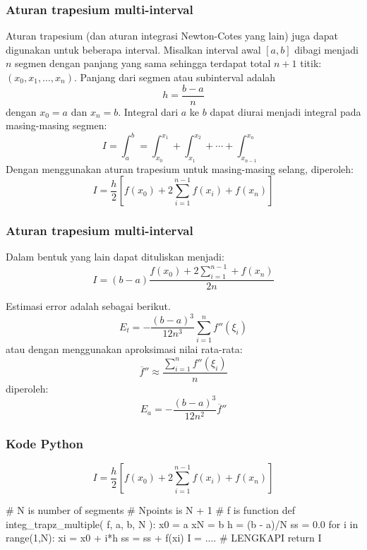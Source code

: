 \begin{frame} 
\frametitle{Aturan trapesium multi-interval}
\fontsize{9pt}{8.0}\selectfont

Aturan trapesium (dan aturan integrasi Newton-Cotes yang lain)
juga dapat digunakan untuk beberapa interval. Misalkan interval
awal $[a,b]$ dibagi menjadi $n$ segmen dengan panjang yang sama sehingga terdapat
total $n+1$ titik: $(x_0, x_1, \ldots, x_n)$. Panjang dari segmen atau subinterval
adalah
\begin{equation*}
h = \frac{b - a}{n}
\end{equation*}
dengan $x_0 = a$ dan $x_n = b$. Integral dari $a$ ke $b$ dapat diurai menjadi
integral pada masing-masing segmen:
\begin{equation*}
I = \int_{a}^{b} = \int_{x_0}^{x_1} + \int_{x_1}^{x_2} + \cdots + \int_{x_{n-1}}^{x_n}
\end{equation*}
Dengan menggunakan aturan trapesium untuk masing-masing selang, diperoleh:
\begin{equation*}
I = \frac{h}{2}\left[
    f(x_{0}) + 2\sum_{i=1}^{n-1} f(x_{i}) + f(x_{n})
\right]
\end{equation*}

\end{frame}


\begin{frame}
\frametitle{Aturan trapesium multi-interval}
\fontsize{9pt}{8.0}\selectfont

Dalam bentuk yang lain dapat dituliskan menjadi:
\begin{equation*}
I = (b - a) \frac{f(x_{0}) + 2\sum_{i=1}^{n-1} + f(x_{n})}{2n}
\end{equation*}

Estimasi error adalah sebagai berikut.
\begin{equation*}
E_{t} = -\frac{(b - a)^3}{12n^3} \sum_{i=1}^{n} f''(\xi_{i})
\end{equation*}
atau dengan menggunakan aproksimasi nilai rata-rata:
\begin{equation*}
\overline{f}'' \approx \frac{\sum_{i=1}^{n} f''(\xi_{i})}{n}
\end{equation*}
diperoleh:
\begin{equation*}
E_{a} = -\frac{(b - a)^3}{12n^2} \overline{f}''
\end{equation*}

\end{frame}


\begin{frame}[fragile]
\frametitle{Kode Python}

\begin{equation*}
I = \frac{h}{2}\left[
    f(x_{0}) + 2\sum_{i=1}^{n-1} f(x_{i}) + f(x_{n})
\right]
\end{equation*}

\begin{pythoncode}
# N is number of segments
# Npoints is N + 1
# f is function
def integ_trapz_multiple( f, a, b, N ):
    x0 = a
    xN = b
    h = (b - a)/N
    ss = 0.0
    for i in range(1,N):
        xi = x0 + i*h
        ss = ss + f(xi)
    I = .... # LENGKAPI
    return I
\end{pythoncode}

\end{frame}


